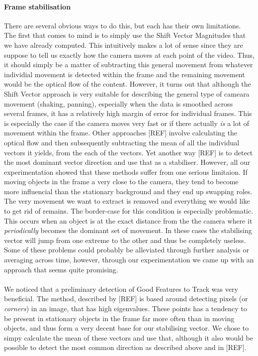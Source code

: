 \paragraph{Frame stabilisation}
%
There are several obvious ways to do this, but each has their own limitations. The first that comes to mind is to simply use the Shift Vector Magnitudes that we have already computed. This intuitively makes a lot of sense since they are suppose to tell us exactly how the camera moves at each point of the video. Thus, it should simply be a matter of subtracting this general movement from whatever individial movement is detected within the frame and the remaining movement would be the optical flow of the content. However, it turns out that although the Shift Vector approach is very suitable for describing the general type of cameara movement (shaking, panning), especially when the data is smoothed across several frames, it has a relatively high margin of error for individual frames. This is especially the case if the camera moves very fast or if there actually \textit{is} a lot of movement within the frame. Other approaches [REF] involve calculating the optical flow and then subsequently subtracting the mean of all the individual vectors it yields, from the each of the vectors. Yet another way [REF] is to detect the most dominant vector direction and use that as a stabiliser. However, all our experimentation showed that these methods suffer from one serious limitaion. If moving objects in the frame a very close to the camera, they tend to become more influencial than the stationary background and they end up swapping roles. The very movement we want to extract is removed and everything we would like to get rid of remains. The border-case for this condition is especially problematic. This occurs when an object is at the exact distance from the the camera where it \textit{periodically} becomes the dominant set of movement. In these cases the stabilising vector will jump from one extreme to the other and thus be completely useless.\\
Some of these problems could probably be alleviated through further analysis or averaging across time, however, through our experimentation we came up with an approach that seems quite promising.\\\\
%
We noticed that a preliminary detection of Good Features to Track was very beneficial. The method, described by [REF] is based around detecting pixels (or \textit{corners}) in an image, that has high eigenvalues. These points has a tendency to be present in stationary objects in the frame far more often than in moving objects, and thus form a very decent base for our stabilising vector. We chose to simpy calculate the mean of these vectors and use that, although it also would be possible to detect the most common direction as described above and in [REF].
%
